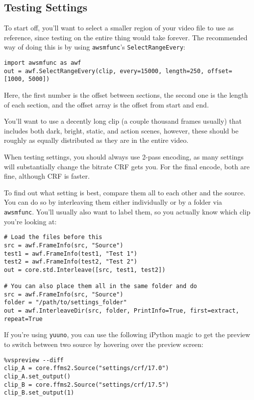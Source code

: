 \documentclass{scrartcl}
\begin{document}
\subsection{Testing Settings}

To start off, you'll want to select a smaller region of your video file to use as reference, since testing on the entire thing would take forever.  The recommended way of doing this is by using \texttt{awsmfunc}'s \texttt{SelectRangeEvery}:
\begin{lstlisting}
import awsmfunc as awf
out = awf.SelectRangeEvery(clip, every=15000, length=250, offset=[1000, 5000])
\end{lstlisting}
Here, the first number is the offset between sections, the second one is the length of each section, and the offset array is the offset from start and end.

You'll want to use a decently long clip (a couple thousand frames usually) that includes both dark, bright, static, and action scenes, however, these should be roughly as equally distributed as they are in the entire video.

When testing settings, you should always use 2-pass encoding, as many settings will substantially change the bitrate CRF gets you.  For the final encode, both are fine, although CRF is faster.

To find out what setting is best, compare them all to each other and the source.  You can do so by interleaving them either individually or by a folder via \texttt{awsmfunc}.  You'll usually also want to label them, so you actually know which clip you're looking at:
\begin{lstlisting}
# Load the files before this
src = awf.FrameInfo(src, "Source")
test1 = awf.FrameInfo(test1, "Test 1")
test2 = awf.FrameInfo(test2, "Test 2")
out = core.std.Interleave([src, test1, test2])

# You can also place them all in the same folder and do
src = awf.FrameInfo(src, "Source")
folder = "/path/to/settings_folder"
out = awf.InterleaveDir(src, folder, PrintInfo=True, first=extract, repeat=True
\end{lstlisting}

If you're using \texttt{yuuno}, you can use the following iPython magic to get the preview to switch between two source by hovering over the preview screen:
\begin{lstlisting}
%vspreview --diff
clip_A = core.ffms2.Source("settings/crf/17.0")
clip_A.set_output()
clip_B = core.ffms2.Source("settings/crf/17.5")
clip_B.set_output(1)
\end{lstlisting}
\end{document}
